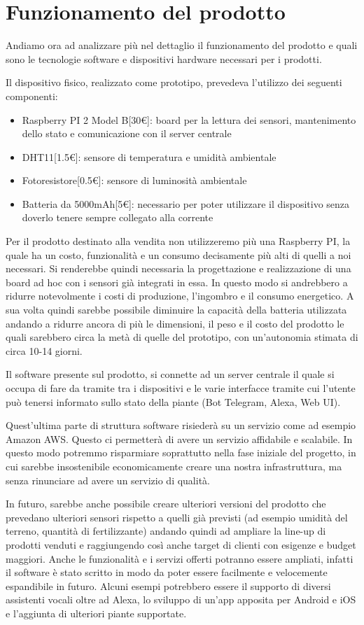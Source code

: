\section{Funzionamento del prodotto}

Andiamo ora ad analizzare più nel dettaglio il funzionamento del prodotto e quali sono le tecnologie software e dispositivi hardware necessari per i prodotti.

Il dispositivo fisico, realizzato come prototipo, prevedeva l'utilizzo dei seguenti componenti:
\begin{itemize}
	\item Raspberry PI 2 Model B[30€]: board per la lettura dei sensori, mantenimento dello stato e comunicazione con il server centrale
	\item DHT11[1.5€]: sensore di temperatura e umidità ambientale
	\item Fotoresistore[0.5€]: sensore di luminosità ambientale
	\item Batteria da 5000mAh[5€]: necessario per poter utilizzare il dispositivo senza doverlo tenere sempre collegato alla corrente
\end{itemize}

Per il prodotto destinato alla vendita non utilizzeremo più una Raspberry PI, la quale ha un costo, funzionalità e un consumo decisamente più alti di quelli a noi necessari. Si renderebbe quindi necessaria la progettazione e realizzazione di una board ad hoc con i sensori già integrati in essa. In questo modo si andrebbero a ridurre notevolmente i costi di produzione, l'ingombro e il consumo energetico. A sua volta quindi sarebbe possibile diminuire la capacità della batteria utilizzata andando a ridurre ancora di più le dimensioni, il peso e il costo del prodotto le quali sarebbero circa la metà di quelle del prototipo, con un'autonomia stimata di circa 10-14 giorni.

Il software presente sul prodotto, si connette ad un server centrale il quale si occupa di fare da tramite tra i dispositivi e le varie interfacce tramite cui l'utente può tenersi informato sullo stato della piante (Bot Telegram, Alexa, Web UI).
 
Quest'ultima parte di struttura software risiederà su un servizio come ad esempio Amazon AWS. Questo ci permetterà di avere un servizio affidabile e scalabile. In questo modo potremmo risparmiare soprattutto nella fase iniziale del progetto, in cui sarebbe insostenibile economicamente creare una nostra infrastruttura, ma senza rinunciare ad avere un servizio di qualità.

In futuro, sarebbe anche possibile creare ulteriori versioni del prodotto che prevedano ulteriori sensori rispetto a quelli già previsti (ad esempio umidità del terreno, quantità di fertilizzante) andando quindi ad ampliare la line-up di prodotti venduti e raggiungendo così anche target di clienti con esigenze e budget maggiori.
Anche le funzionalità e i servizi offerti potranno essere ampliati, infatti il software è stato scritto in modo da poter essere facilmente e velocemente espandibile in futuro. Alcuni esempi potrebbero essere il supporto di diversi assistenti vocali oltre ad Alexa, lo sviluppo di un'app apposita per Android e iOS e l'aggiunta di ulteriori piante supportate.